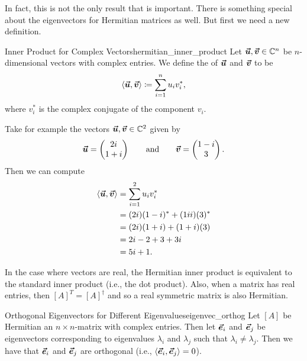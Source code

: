             In fact, this is not the only result that is important.  There is something special about the eigenvectors for Hermitian matrices as well. But first we need a new definition.
            
            \begin{df}{Inner Product for Complex Vectors}{hermitian_inner_product}
                Let $\boldsymbol{\boldsymbol{\vec{u}}},\boldsymbol{\boldsymbol{\vec{v}}} \in \mathbb{C}^n$ be $n$-dimensional vectors with complex entries. We define the  of $\boldsymbol{\boldsymbol{\vec{u}}}$ and $\boldsymbol{\boldsymbol{\vec{v}}}$ to be
                \[
                \langle \boldsymbol{\boldsymbol{\vec{u}}},\boldsymbol{\boldsymbol{\vec{v}}} \rangle \coloneqq \sum_{i=1}^n u_i v_i^*,
                \]
                where $v_i^*$ is the complex conjugate of the component $v_i$.
            \end{df}
            
            Take for example the vectors $\boldsymbol{\boldsymbol{\vec{u}}},\boldsymbol{\boldsymbol{\vec{v}}} \in \mathbb{C}^2$ given by
            \[
            \boldsymbol{\boldsymbol{\vec{u}}} = \begin{pmatrix} 2i \\ 1+i \end{pmatrix} \qquad \textrm{and} \qquad \boldsymbol{\boldsymbol{\vec{v}}} = \begin{pmatrix} 1-i \\ 3 \end{pmatrix}.
            \]
            Then we can compute
            \begin{align*}
            \langle \boldsymbol{\boldsymbol{\vec{u}}}, \boldsymbol{\boldsymbol{\vec{v}}} \rangle &= \sum_{i=1}^2 u_i v_i^*\\
            &= (2i)(1-i)^* + (1ii)(3)^*\\
            &= (2i)(1+i)+(1+i)(3)\\
            &= 2i - 2 + 3 + 3i\\
            &=5i +1.
            \end{align*}
            
            \begin{remark}
                In the case where vectors are real, the Hermitian inner product is equivalent to the standard inner product (i.e., the dot product). Also, when a matrix has real entries, then $[A]^T=[A]^\dagger$ and so a real symmetric matrix is also Hermitian.
            \end{remark}
            
            \begin{thm}{Orthogonal Eigenvectors for Different Eigenvalues}{eigenvec_orthog}
                Let $[A]$ be Hermitian an $n\times n$-matrix with complex entries.  Then let $\boldsymbol{\vec{e}}_i$ and $\boldsymbol{\vec{e}}_j$ be eigenvectors corresponding to eigenvalues $\lambda_i$ and $\lambda_j$ such that $\lambda_i \neq \lambda_j$. Then we have that $\boldsymbol{\vec{e}}_i$ and $\boldsymbol{\vec{e}}_j$ are orthogonal (i.e., $\langle \boldsymbol{\vec{e}}_i, \boldsymbol{\vec{e}}_j\rangle=0$).
            \end{thm}
            
